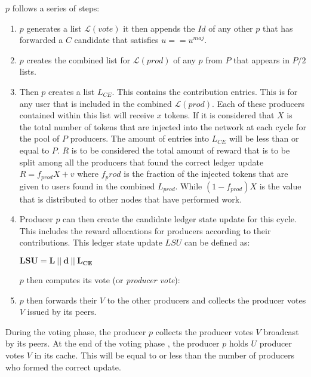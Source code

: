 $p$ follows a series of steps:

\begin{enumerate}
\item $p$ generates a list $\mathcal{L}(vote)$ it then appends the $Id$ of any other $p$ that has forwarded a $C$ candidate that satisfies $u == u^{maj}$.
\item $p$ creates the combined list for $\mathcal{L}(prod)$ of any $p$ from $P$ that appears in $P/2$ lists.
\item Then $p$ creates a list $L_{CE}$. This contains the contribution entries. This is for any user that is included in the combined $\mathcal{L}(prod)$. Each of these producers contained within this list will receive $x$ tokens. If it is considered that $X$ is the total number of tokens that are injected into the network at each cycle for the pool of $P$ producers. The amount of entries into $L_{CE}$ will be less than or equal to $P$. $R$ is to be considered the total amount of reward that is to be split among all the producers that found the correct ledger update $R = f_{prod}X + v$ where $f_prod$ is the fraction of the injected tokens that are given to users found in the combined $L_{prod}$. While $(1-f_{prod})X$ is the value that is distributed to other nodes that have performed work.
\item Producer $p$ can then create the candidate ledger state update for this cycle. This includes the reward allocations for producers according to their contributions. This ledger state update $LSU$ can be defined as:

\begin{center}
$\mathbf{LSU = L~||~d~||~L_{CE}}$
\end{center}


$p$ then computes its vote (or \textit{producer vote}):
\begin{center}
\end{center}


\item $p$ then forwards their $V$ to the other producers and collects the producer votes $V$ issued by its peers.

\end{enumerate}


During the voting phase, the producer $p$ collects the producer votes $V$ broadcast by its peers. At the end of the voting phase , the producer $p$ holds $U$ producer votes $V$ in its cache. This will be equal to or less than the number of producers who formed the correct update. 
